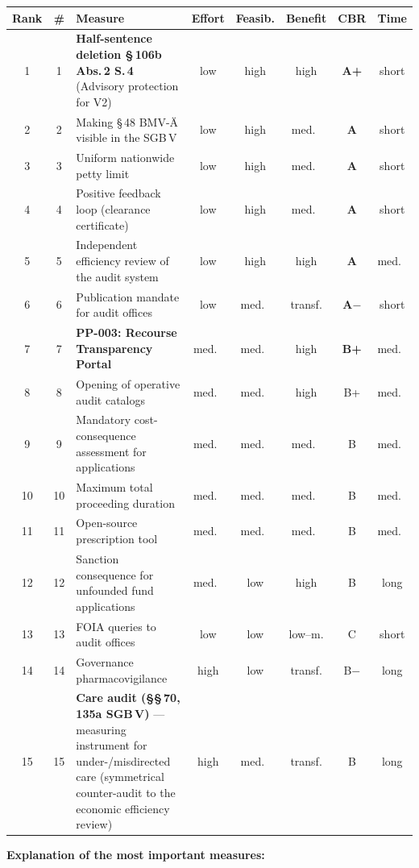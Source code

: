 \documentclass{umbruch-position}
\begin{document}
\smallskip
{\small
\begin{tabularx}{\textwidth}{c c X c c c c c}
\hline
\textbf{Rank} & \textbf{\#} & \textbf{Measure} & \textbf{Effort} & \textbf{Feasib.} & \textbf{Benefit} & \textbf{CBR} & \textbf{Time} \\
\hline
1 & 1 & \textbf{Half-sentence deletion \S\,106b Abs.\,2 S.\,4} (Advisory protection for V2) & low & high & high & \textbf{A+} & short \\
2 & 2 & Making \S\,48 BMV-\"A visible in the SGB\,V & low & high & med.\ & \textbf{A} & short \\
3 & 3 & Uniform nationwide petty limit & low & high & med.\ & \textbf{A} & short \\
4 & 4 & Positive feedback loop (clearance certificate) & low & high & med.\ & \textbf{A} & short \\
5 & 5 & Independent efficiency review of the audit system & low & high & high & \textbf{A} & med.\ \\
6 & 6 & Publication mandate for audit offices & low & med.\ & transf. & \textbf{A$-$} & short \\
7 & 7 & \textbf{PP-003: Recourse Transparency Portal} & med.\ & med.\ & high & \textbf{B+} & med.\ \\
8 & 8 & Opening of operative audit catalogs & med.\ & med.\ & high & B+ & med.\ \\
9 & 9 & Mandatory cost-consequence assessment for applications & med.\ & med.\ & med.\ & B & med.\ \\
10 & 10 & Maximum total proceeding duration & med.\ & med.\ & med.\ & B & med.\ \\
11 & 11 & Open-source prescription tool & med.\ & med.\ & med.\ & B & med.\ \\
12 & 12 & Sanction consequence for unfounded fund applications & med.\ & low & high & B & long \\
13 & 13 & FOIA queries to audit offices & low & low & low--m. & C & short \\
14 & 14 & Governance pharmacovigilance & high & low & transf. & B$-$ & long \\
15 & 15 & \textbf{Care audit (\S\S\,70, 135a SGB\,V)} --- measuring instrument for under-/misdirected care (symmetrical counter-audit to the economic efficiency review) & high & med.\ & transf. & B & long \\
\hline
\end{tabularx}
}
\smallskip

\textbf{Explanation of the most important measures:}
\end{document}
